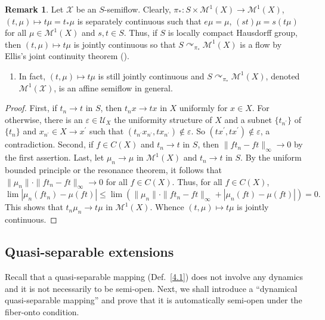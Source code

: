 \documentclass[12pt,final,3p,times]{elsarticle}
\theoremstyle{definition}
\newtheorem{srem}[sthm]{Remark}
\numberwithin{equation}{section}
\begin{document}
\begin{srem}\label{5.1.6}
Let $\mathscr{X}$ be an $S$-semiflow. Clearly, $\pi_*\colon S\times\mathcal{M}^1(X)\rightarrow\mathcal{M}^1(X)$, $(t,\mu)\mapsto t\mu=t_*\mu$ is separately continuous such that $e\mu=\mu$, $(st)\mu=s(t\mu)$ for all $\mu\in\mathcal{M}^1(X)$ and $s,t\in S$. Thus, if $S$ is locally compact Hausdorff group, then $(t,\mu)\mapsto t\mu$ is jointly continuous so that $S\curvearrowright_{\pi_*}\!\mathcal{M}^1(X)$ is a flow by Ellis's joint continuity theorem (\cite{E57}).

\begin{enumerate}[$\bullet$]
\item In fact, $(t,\mu)\mapsto t\mu$ is still jointly continuous and $S\curvearrowright_{\pi_*}\!\mathcal{M}^1(X)$, denoted $\mathcal{M}^1(\mathscr{X})$, is an affine semiflow in general.
\end{enumerate}
    \begin{proof}
    First, if $t_n\to t$ in $S$, then $t_nx\to tx$ in $X$ uniformly for $x\in X$. For otherwise, there is an $\varepsilon\in\mathscr{U}_X$ the uniformity structure of $X$ and a subnet $\{t_{n^\prime}\}$ of $\{t_n\}$ and $x_{n^\prime}\in X\to x^\prime$ such that $(t_{n^\prime}x_{n^\prime}, tx_{n^\prime})\notin\varepsilon$. So $(tx^\prime,tx^\prime)\notin\varepsilon$, a contradiction.
    Second, if $f\in C(X)$ and $t_n\to t$ in $S$, then $\|ft_n-ft\|_\infty\to 0$ by the first assertion.
    Last, let $\mu_n\to\mu$ in $\mathcal{M}^1(X)$ and $t_n\to t$ in $S$. By the uniform bounded principle or the resonance theorem, it follows that $\|\mu_n\|\cdot\|ft_n-ft\|_\infty\to 0$ for all $f\in C(X)$. Thus, for all $f\in C(X)$,
    $$    
    \lim|\mu_n(ft_n)-\mu(ft)|\le\lim(\|\mu_n\|\cdot\|ft_n-ft\|_\infty+|\mu_n(ft)-\mu(ft)|)=0.
    $$
    This shows that $t_n\mu_n\to t\mu$ in $\mathcal{M}^1(X)$. Whence $(t,\mu)\mapsto t\mu$ is jointly continuous.
    \end{proof}
\end{srem}

\subsection{Quasi-separable extensions}\label{s5.2}
Recall that a quasi-separable mapping (Def.~\ref{4.1}) does not involve any dynamics and it is not necessarily to be semi-open. Next, we shall introduce a ``dynamical quasi-separable mapping'' and prove that it is automatically semi-open under the fiber-onto condition.
\end{document}

